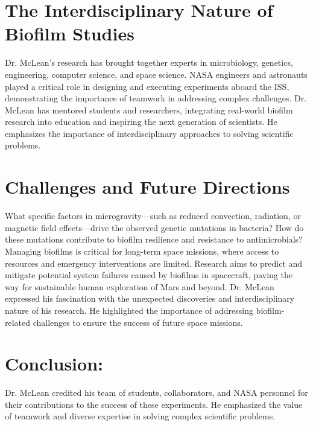 \documentclass[12pt]{article}
\begin{document}
\section{The Interdisciplinary Nature of Biofilm Studies}
    Dr. McLean’s research has brought together experts in microbiology, genetics, engineering, computer science, and space science. NASA engineers and astronauts played a critical role in designing and executing experiments aboard the ISS, demonstrating the importance of teamwork in addressing complex challenges. Dr. McLean has mentored students and researchers, integrating real-world biofilm research into education and inspiring the next generation of scientists. He emphasizes the importance of interdisciplinary approaches to solving scientific problems.


\section{Challenges and Future Directions}
    What specific factors in microgravity—such as reduced convection, radiation, or magnetic field effects—drive the observed genetic mutations in bacteria? How do these mutations contribute to biofilm resilience and resistance to antimicrobials? Managing biofilms is critical for long-term space missions, where access to resources and emergency interventions are limited. Research aims to predict and mitigate potential system failures caused by biofilms in spacecraft, paving the way for sustainable human exploration of Mars and beyond. Dr. McLean expressed his fascination with the unexpected discoveries and interdisciplinary nature of his research. He highlighted the importance of addressing biofilm-related challenges to ensure the success of future space missions.


\section{Conclusion:}
    Dr. McLean credited his team of students, collaborators, and NASA personnel for their contributions to the success of these experiments. He emphasized the value of teamwork and diverse expertise in solving complex scientific problems.
\end{document}
